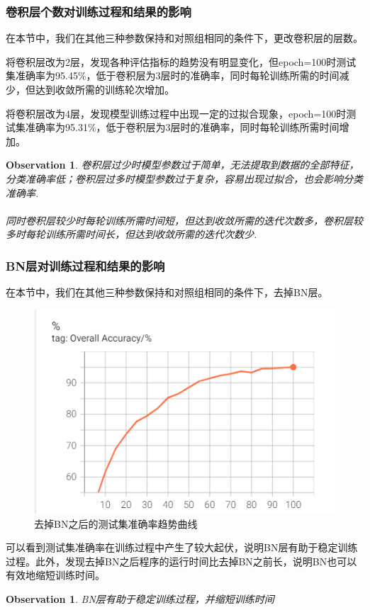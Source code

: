 \documentclass[11pt]{article}
\newtheorem{observation}[theorem]{Observation}
\begin{document}
\subsubsection{卷积层个数对训练过程和结果的影响}
在本节中，我们在其他三种参数保持和对照组相同的条件下，更改卷积层的层数。\par
将卷积层改为2层，发现各种评估指标的趋势没有明显变化，但epoch=100时测试集准确率为95.45\%，低于卷积层为3层时的准确率，同时每轮训练所需的时间减少，但达到收敛所需的训练轮次增加。\par
将卷积层改为4层，发现模型训练过程中出现一定的过拟合现象，epoch=100时测试集准确率为95.31\%，低于卷积层为3层时的准确率，同时每轮训练所需时间增加。
\begin{observation}
卷积层过少时模型参数过于简单，无法提取到数据的全部特征，分类准确率低；卷积层过多时模型参数过于复杂，容易出现过拟合，也会影响分类准确率. \paragraph{}同时卷积层较少时每轮训练所需时间短，但达到收敛所需的迭代次数多，卷积层较多时每轮训练所需时间长，但达到收敛所需的迭代次数少.\par
\end{observation}

\subsubsection{BN层对训练过程和结果的影响}
在本节中，我们在其他三种参数保持和对照组相同的条件下，去掉BN层。\par
\begin{figure}[H]
\centering
\includegraphics[scale=0.6]{images/acc_no_bn.png}
\caption{去掉BN之后的测试集准确率趋势曲线}
\end{figure}
可以看到测试集准确率在训练过程中产生了较大起伏，说明BN层有助于稳定训练过程。此外，发现去掉BN之后程序的运行时间比去掉BN之前长，说明BN也可以有效地缩短训练时间。
\begin{observation}
BN层有助于稳定训练过程，并缩短训练时间
\end{observation}
\end{document}
